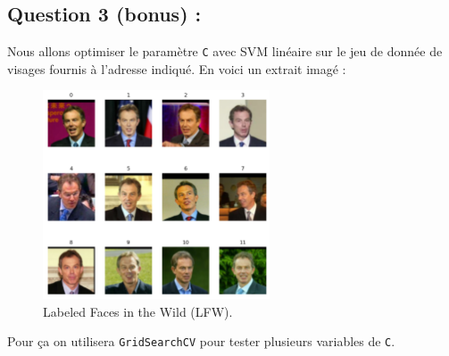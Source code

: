 \documentclass[
  letterpaper,
  DIV=11,
  numbers=noendperiod]{scrartcl}
\begin{document}
\hypertarget{question-3-bonus}{%
\subsection{Question 3 (bonus) :}\label{question-3-bonus}}

Nous allons optimiser le paramètre \texttt{C} avec SVM linéaire sur le
jeu de donnée de visages fournis à l'adresse indiqué. En voici un
extrait imagé :

\begin{figure}

{\centering \includegraphics[width=0.6\textwidth,height=\textheight]{tp_files/mediabag/extraits.pdf}

}

\caption{Labeled Faces in the Wild (LFW).}

\end{figure}

Pour ça on utilisera \texttt{GridSearchCV} pour tester plusieurs
variables de \texttt{C}.
\end{document}
